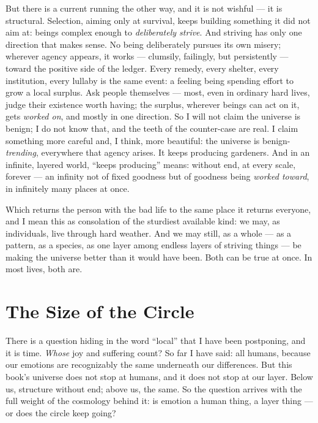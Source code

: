 \documentclass[fontsize=11pt,paper=a4,pagesize=auto,parskip=half-]{scrbook}
\newcommand\En{\centerline{\textemdash \qquad \ding{166} \qquad \textemdash}}
\begin{document}
But there is a current running the other way, and it is not wishful --- it is structural. Selection, aiming only at survival, keeps building something it did not aim at: beings complex enough to \emph{deliberately strive}. And striving has only one direction that makes sense. No being deliberately pursues its own misery; wherever agency appears, it works --- clumsily, failingly, but persistently --- toward the positive side of the ledger. Every remedy, every shelter, every institution, every lullaby is the same event: a feeling being spending effort to grow a local surplus. Ask people themselves --- most, even in ordinary hard lives, judge their existence worth having; the surplus, wherever beings can act on it, gets \emph{worked on}, and mostly in one direction. So I will not claim the universe is benign; I do not know that, and the teeth of the counter-case are real. I claim something more careful and, I think, more beautiful: the universe is benign-\emph{trending}, everywhere that agency arises. It keeps producing gardeners. And in an infinite, layered world, ``keeps producing'' means: without end, at every scale, forever --- an infinity not of fixed goodness but of goodness being \emph{worked toward}, in infinitely many places at once.

Which returns the person with the bad life to the same place it returns everyone, and I mean this as consolation of the sturdiest available kind: we may, as individuals, live through hard weather. And we may still, as a whole --- as a pattern, as a species, as one layer among endless layers of striving things --- be making the universe better than it would have been. Both can be true at once. In most lives, both are.

\En

\section{The Size of the Circle}

There is a question hiding in the word ``local'' that I have been postponing, and it is time. \emph{Whose} joy and suffering count? So far I have said: all humans, because our emotions are recognizably the same underneath our differences. But this book's universe does not stop at humans, and it does not stop at our layer. Below us, structure without end; above us, the same. So the question arrives with the full weight of the cosmology behind it: is emotion a human thing, a layer thing --- or does the circle keep going?
\end{document}
